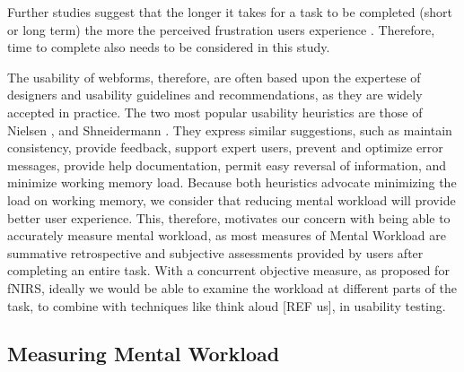 \documentclass[../main/Feedback.tex]{subfiles}
\begin{document}
Further studies suggest that the longer it takes for a task to be completed (short or long term) the more the perceived frustration users experience \cite{mendoza2005usability,bessiere2004social}.
Therefore, time to complete also needs to be considered in this study.

The usability of webforms, therefore, are often based upon the expertese of designers and usability guidelines and recommendations, as they are widely accepted in practice.
The two most popular usability heuristics are those of Nielsen \cite{nielsen1990heuristic}, and Shneidermann \cite{shneiderman1992designing}.
They express similar suggestions, such as maintain consistency, provide feedback, support expert users, prevent and optimize error messages, provide help documentation, permit easy reversal of information, and minimize working memory load. %
Because both heuristics advocate minimizing the load on working memory, we consider that reducing mental workload will provide better user experience. This, therefore, motivates our concern with being able to accurately measure mental workload, as most measures of Mental Workload are summative retrospective and subjective assessments provided by users after completing an entire task. With a concurrent objective measure, as proposed for fNIRS, ideally we would be able to examine the workload at different parts of the task, to combine with techniques like think aloud [REF us], in usability testing.


\subsection{Measuring Mental Workload}
\end{document}
